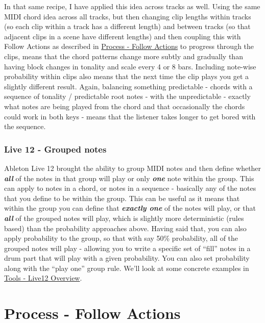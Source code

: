 \documentclass[
  12pt,
  letterpaper,
  oneside,
  open=any]{scrbook}
\begin{document}
In that same recipe, I have applied this idea across tracks as well.
Using the same MIDI chord idea across all tracks, but then changing clip
lengths within tracks (so each clip within a track has a different
length) and between tracks (so that adjacent clips in a scene have
different lengths) and then coupling this with Follow Actions as
described in \hyperref[Chapter-003-Process-Follow_Actions]{Process -
Follow Actions} to progress through the clips, means that the chord
patterns change more subtly and gradually than having block changes in
tonality and scale every 4 or 8 bars. Including note-wise probability
within clips also means that the next time the clip plays you get a
slightly different result. Again, balancing something predictable -
chords with a sequence of tonality / predictable root notes - with the
unpredictable - exactly what notes are being played from the chord and
that occasionally the chords could work in both keys - means that the
listener takes longer to get bored with the sequence.

\subsection{Live 12 - Grouped notes}\label{live-12---grouped-notes}

Ableton Live 12 brought the ability to group MIDI notes and then define
whether \textbf{\emph{all}} of the notes in that group will play or only
\textbf{\emph{one}} note within the group. This can apply to notes in a
chord, or notes in a sequence - basically any of the notes that you
define to be within the group. This can be useful as it means that
within the group you can define that \textbf{\emph{exactly one}} of the
notes will play, or that \textbf{\emph{all}} of the grouped notes will
play, which is slightly more deterministic (rules based) than the
probability approaches above. Having said that, you can also apply
probability to the group, so that with say 50\% probability, all of the
grouped notes will play - allowing you to write a specific set of
``fill'' notes in a drum part that will play with a given probability.
You can also set probability along with the ``play one'' group rule.
We'll look at some concrete examples in
\hyperref[Chapter-030-Tools-Live12_Intro]{Tools - Live12 Overview}.


\chapter{Process - Follow
Actions}\label{Chapter-003-Process-Follow_Actions}
\end{document}

